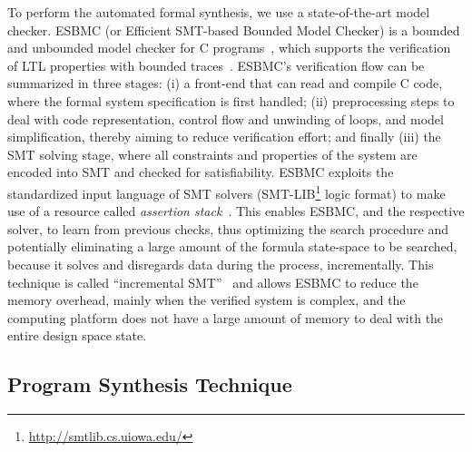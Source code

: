 \documentclass[journal]{IEEEtran}
\begin{document}
To perform the automated formal synthesis, we use a state-of-the-art model checker. ESBMC (or Efficient SMT-based Bounded Model Checker) is a bounded and unbounded model checker for C programs~\cite{esbmc2018}, which supports the verification of LTL properties with bounded traces~\cite{DBLP:journals/sosym/MorseCN015}. ESBMC's verification flow can be summarized in three stages: (i) a front-end that can read and compile C code, where the formal system specification is first handled; (ii) preprocessing steps to deal with code representation, control flow and unwinding of loops, and model simplification, thereby aiming to reduce verification effort; and finally (iii) the SMT solving stage, where all constraints and properties of the system are encoded into SMT and checked for satisfiability. ESBMC exploits the standardized input language of SMT solvers (SMT-LIB\footnote{\url{http://smtlib.cs.uiowa.edu/}} logic format) to make use of a resource called \textit{assertion stack}~\cite{Morse2015}. This enables ESBMC, and the respective solver, to learn from previous checks, thus optimizing the search procedure and potentially eliminating a large amount of the formula state-space to be searched, because it solves and disregards data during the process, incrementally. This technique is called ``incremental SMT''~\cite{DBLP:journals/fac/SchrammelKBMTB17} and allows ESBMC to reduce the memory overhead, mainly when the verified system is complex, and the computing platform does not have a large amount of memory to deal with the entire design space state.

%
\subsection{Program Synthesis Technique}
\label{sec:ProgramSynthesis}
\end{document}
